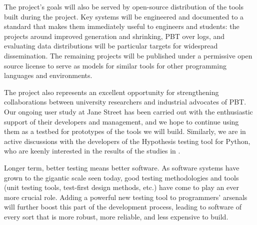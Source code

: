 \smallskip
{}
%
The project's goals will also be served by open-source distribution of the tools
built during the project. Key systems will be engineered and documented to a standard
that makes them immediately useful to engineers and students: the projects around
improved generation and shrinking, PBT over logs, and evaluating data
distributions will be particular targets for widespread
dissemination. The remaining projects will be published under a permissive
open source license to serve as models for similar tools for other programming languages and environments.

The project also represents an excellent opportunity for strengthening
collaborations between university researchers and industrial advocates of PBT.  Our
ongoing user study at Jane Street has been carried out with the
enthusiastic support of their developers and management, and we hope
to continue using them as a testbed for prototypes of the tools we
will build.  Similarly, we are in active discussions with the
developers of the Hypothesis testing tool for Python, who are keenly
interested in the results of the studies in
.

Longer term, better testing means better software.  As software
systems have grown to the gigantic scale seen today, good testing
methodologies and tools (unit testing tools, test-first design
methods, etc.) have come to play an ever more crucial role.  Adding a
powerful new testing tool to programmers' arsenals will further boost
this part of the development process, leading to software of every
sort that is more robust, more reliable, and less expensive to build.




